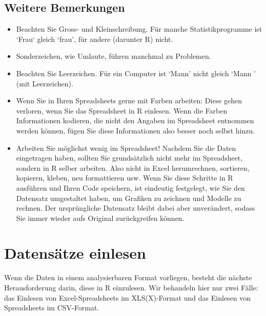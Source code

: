 \documentclass[oneside, 10pt]{book}\usepackage[]{graphicx}\usepackage[]{xcolor}
\begin{document}
\subsection{Weitere Bemerkungen}
\begin{itemize}

\item Beachten Sie Gross- und Kleinschreibung. Für manche Statistikprogramme ist `Frau` gleich `frau', für andere (darunter R) nicht.

\item Sonderzeichen, wie Umlaute, führen manchmal zu Problemen.

\item Beachten Sie Leerzeichen. Für ein Computer ist `Mann' nicht gleich `Mann ' (mit Leerzeichen).

\item Wenn Sie in Ihren Spread\-sheets gerne mit Farben arbeiten: Diese gehen verloren, wenn Sie das Spread\-sheet in R einlesen. Wenn die Farben Informationen kodieren, die nicht den Angaben
im Spread\-sheet entnommen werden können, fügen Sie diese Informationen also besser noch selbst hinzu.

\item Arbeiten Sie möglichst wenig im Spreadsheet!
Nachdem Sie die Daten eingetragen haben, sollten Sie grundsätzlich nicht mehr
im Spreadsheet, sondern in R selber arbeiten. Also nicht in Excel herumrechnen,
sortieren, kopieren, kleben, neu formattieren usw. Wenn Sie diese Schritte in
R ausführen und Ihren Code speichern, ist eindeutig festgelegt, wie Sie den Datensatz
umgestaltet haben, um Grafiken zu zeichnen und Modelle zu rechnen.
Der ursprüngliche Datensatz bleibt dabei aber unverändert, sodass Sie immer
wieder aufs Original zurückgreifen können.
\end{itemize}


\section{Datensätze einlesen}
Wenn die Daten in einem analysierbaren Format vorliegen,
besteht die nächste Herausforderung darin, diese in R
einzulesen. Wir behandeln hier nur zwei Fälle:
das Einlesen von Excel-Spreadsheets im XLS(X)-Format
und das Einlesen von Spreadsheets im CSV-Format.
\end{document}
